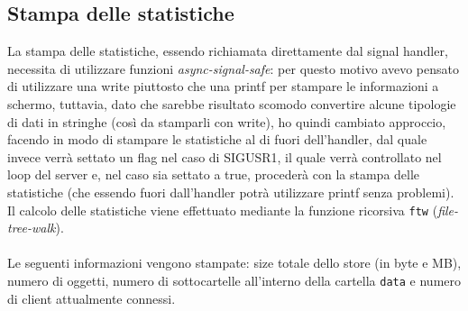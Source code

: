 \subsection{Stampa delle statistiche}
\begin{flushleft}

La stampa delle statistiche, essendo richiamata direttamente dal signal handler, necessita di utilizzare funzioni \emph{async-signal-safe}: per questo motivo avevo pensato di utilizzare una write piuttosto che una printf per stampare le informazioni a schermo, tuttavia, dato che sarebbe risultato scomodo convertire alcune tipologie di dati in stringhe (così da stamparli con write), ho quindi cambiato approccio, facendo in modo di stampare le statistiche al di fuori dell'handler, dal quale invece verrà settato un flag nel caso di SIGUSR1, il quale verrà controllato nel loop del server e, nel caso sia settato a true, procederà con la stampa delle statistiche (che essendo fuori dall'handler potrà utilizzare printf senza problemi).
Il calcolo delle statistiche viene effettuato mediante la funzione ricorsiva \texttt{ftw} (\emph{file-tree-walk}).
\\~\\
Le seguenti informazioni vengono stampate: size totale dello store (in byte e MB), numero di oggetti, numero di sottocartelle all'interno della cartella \texttt{data} e numero di client attualmente connessi.  
\end{flushleft}

\newpage

